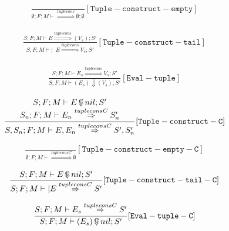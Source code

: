 \documentclass{scrartcl}
\DeclareMathOperator{\ceval}{\overset{C}{\smash{\Downarrow}}}
\begin{document}
    \begin{align*}
    \frac{}{
        \emptyset; F; M \vdash \overset{tuplecons}{\Rightarrow} \emptyset; \emptyset
    }[\mathtt{Tuple-construct-empty}]
    \end{align*}
    
    \begin{align*}
    \frac{
        S; F; M \vdash E \overset{tuplecons}{\Rightarrow} ( V_s ); S'
    }{
        S; F; M \vdash | \enspace E \overset{tuplecons}{\Rightarrow} V_s; S'
    }[\mathtt{Tuple-construct-tail}]
    \end{align*}
    
    \begin{align*}
    \frac{
        \begin{matrix}
        S; F; M \vdash E_s \overset{tuplecons}{\Rightarrow} V_s; S'
        \end{matrix}
    }{
        S; F; M \vdash ( E_s ) \Downarrow ( V_s ); S'
    }[\mathtt{Eval-tuple}]
    \end{align*}
    
    \begin{align*}
    \frac{
        \begin{matrix}
        S; F; M \vdash E \ceval nil; S' \\
        S_n; F; M \vdash E_n \overset{tupleconsC}{\Rightarrow} S_n'
        \end{matrix}
    }{
        S, S_n; F; M \vdash E, E_n \overset{tupleconsC}{\Rightarrow} S', S_n'
    }[\mathtt{Tuple-construct-C}]
    \end{align*}
    
    \begin{align*}
    \frac{}{
        \emptyset; F; M \vdash \overset{tupleconsC}{\Rightarrow} \emptyset
    }[\mathtt{Tuple-construct-empty-C}]
    \end{align*}
    
    \begin{align*}
    \frac{
        S; F; M \vdash E \ceval nil; S'
    }{
        S; F; M \vdash | E \overset{tupleconsC}{\Rightarrow} S'
    }[\mathtt{Tuple-construct-tail-C}]
    \end{align*}
    
    \begin{align*}
    \frac{
        \begin{matrix}
        S; F; M \vdash E_s \overset{tupleconsC}{\Rightarrow} S'
        \end{matrix}
    }{
        S; F; M \vdash ( E_s ) \ceval nil; S'
    }[\mathtt{Eval-tuple-C}]
    \end{align*}
    
\end{document}
